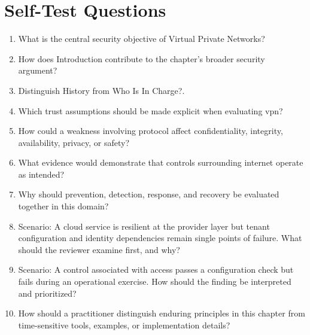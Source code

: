\documentclass[11pt]{article}
\begin{document}
\section*{Self-Test Questions}
\begin{enumerate}
\item What is the central security objective of Virtual Private Networks?
\item How does Introduction contribute to the chapter's broader security argument?
\item Distinguish History from Who Is In Charge?.
\item Which trust assumptions should be made explicit when evaluating vpn?
\item How could a weakness involving protocol affect confidentiality, integrity, availability, privacy, or safety?
\item What evidence would demonstrate that controls surrounding internet operate as intended?
\item Why should prevention, detection, response, and recovery be evaluated together in this domain?
\item Scenario: A cloud service is resilient at the provider layer but tenant configuration and identity dependencies remain single points of failure. What should the reviewer examine first, and why?
\item Scenario: A control associated with access passes a configuration check but fails during an operational exercise. How should the finding be interpreted and prioritized?
\item How should a practitioner distinguish enduring principles in this chapter from time-sensitive tools, examples, or implementation details?
\end{enumerate}
\end{document}
